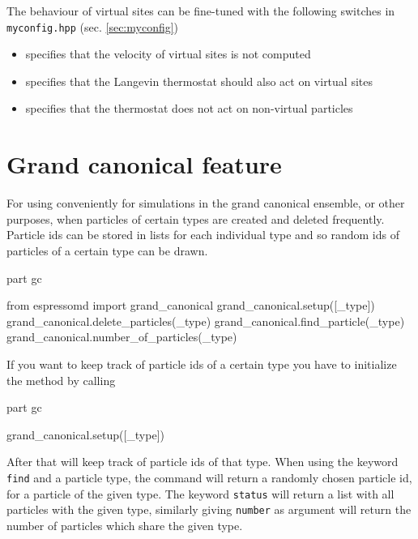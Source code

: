 The behaviour of virtual sites can be fine-tuned with the following
switches in \texttt{myconfig.hpp} (sec. \ref{sec:myconfig})
\begin{itemize}
\item {} specifies that the velocity
  of virtual sites is not computed
\item {} specifies that the Langevin
  thermostat should also act on virtual sites
\item {} specifies that the
  thermostat does not act on non-virtual particles
\end{itemize}

\section{Grand canonical feature}
For using \es conveniently for simulations in the grand canonical ensemble, or
other purposes, when particles of certain types are created and deleted frequently.
Particle ids can be stored in lists for each individual type and so random ids of
particles of a certain type can be drawn. 

\begin{essyntax}
part gc
\end{essyntax}
\begin{pycode}
from espressomd import grand_canonical
grand_canonical.setup([_type])
grand_canonical.delete_particles(_type)
grand_canonical.find_particle(_type)
grand_canonical.number_of_particles(_type)
\end{pycode}

If you want \es to keep track of particle ids of a certain type you have to
initialize the method by calling 
\begin{essyntax}
	part gc 
\end{essyntax}
\begin{pycode}
grand_canonical.setup([_type])
\end{pycode}
After that \es will keep track of particle ids of that type. 
When using the keyword \texttt{find} and a particle type, the
command will return a randomly chosen particle id, for a particle of
the given type. 
The keyword \texttt{status} will return a list with all particles with the given
type, similarly giving \texttt{number} as argument will return the number of
particles which share the given type.

